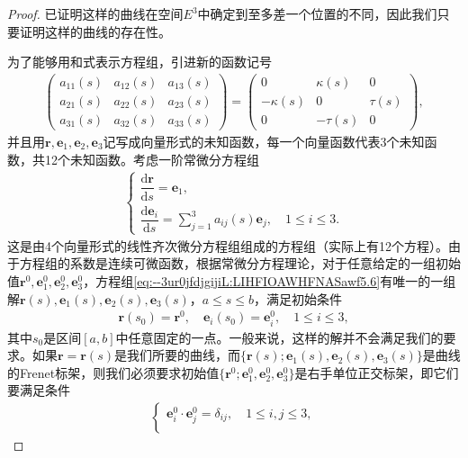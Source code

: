\documentclass[../../main.tex]{subfiles}%
\begin{document}
\begin{proof}
已证明这样的曲线在空间$E^3$中确定到至多差一个位置的不同，因此我们只要证明这样的曲线的存在性。

为了能够用和式表示方程组，引进新的函数记号
\begin{align}
\begin{pmatrix}
a_{11}(s) & a_{12}(s) & a_{13}(s) \\
a_{21}(s) & a_{22}(s) & a_{23}(s) \\
a_{31}(s) & a_{32}(s) & a_{33}(s)
\end{pmatrix}
=
\begin{pmatrix}
0 & \kappa(s) & 0 \\
-\kappa(s) & 0 & \tau(s) \\
0 & -\tau(s) & 0
\end{pmatrix},
\label{eq:--3ur0jfdjgijiL:LIHFIOAWHFNASawf5.5}
\end{align}
并且用$\bm{r},\bm{e}_1,\bm{e}_2,\bm{e}_3$记写成向量形式的未知函数，每一个向量函数代表3个未知函数，共12个未知函数。考虑一阶常微分方程组
\begin{align}
\begin{cases}
\dfrac{\mathrm{d}\bm{r}}{\mathrm{d}s} = \bm{e}_1, \\
\dfrac{\mathrm{d}\bm{e}_i}{\mathrm{d}s} = \sum\limits_{j=1}^3 a_{ij}(s)\bm{e}_j,\quad 1 \leqslant i \leqslant 3.
\end{cases}
\label{eq:--3ur0jfdjgijiL:LIHFIOAWHFNASawf5.6}
\end{align}
这是由4个向量形式的线性齐次微分方程组组成的方程组（实际上有12个方程）。由于方程组的系数是连续可微函数，根据常微分方程理论，对于任意给定的一组初始值$\bm{r}^0,\bm{e}_1^0,\bm{e}_2^0,\bm{e}_3^0$，方程组\eqref{eq:--3ur0jfdjgijiL:LIHFIOAWHFNASawf5.6}有唯一的一组解$\bm{r}(s),\bm{e}_1(s),\bm{e}_2(s),\bm{e}_3(s)$，$a \leqslant s \leqslant b$，满足初始条件
\begin{align}
\bm{r}(s_0) = \bm{r}^0,\quad \bm{e}_i(s_0) = \bm{e}_i^0,\quad 1 \leqslant i \leqslant 3,
\label{eq:--3ur0jfdjgijiL:LIHFIOAWHFNASawf5.7}
\end{align}
其中$s_0$是区间$[a,b]$中任意固定的一点。一般来说，这样的解并不会满足我们的要求。如果$\bm{r} = \bm{r}(s)$是我们所要的曲线，而$\{\bm{r}(s);\bm{e}_1(s),\bm{e}_2(s),\bm{e}_3(s)\}$是曲线的Frenet标架，则我们必须要求初始值$\{\bm{r}^0;\bm{e}_1^0,\bm{e}_2^0,\bm{e}_3^0\}$是右手单位正交标架，即它们要满足条件
\begin{align}
\begin{cases}
\bm{e}_i^0 \cdot \bm{e}_j^0 = \delta_{ij},\quad 1 \leqslant i,j \leqslant 3, \\

\end{cases}
\end{align}
\end{proof}
\end{document}
